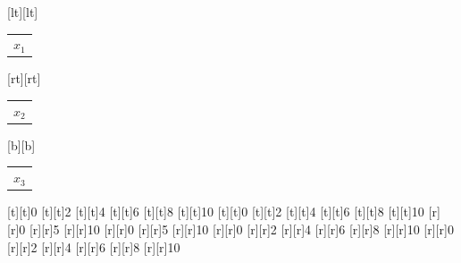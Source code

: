 %    
%
%
\begin{psfrags}%
\psfragscanon%
%
[lt][lt]{\color[rgb]{0,0,0}\setlength{\tabcolsep}{0pt}\begin{tabular}{l}$x_1$\end{tabular}}%
[rt][rt]{\color[rgb]{0,0,0}\setlength{\tabcolsep}{0pt}\begin{tabular}{r}$x_2$\end{tabular}}%
[b][b]{\color[rgb]{0,0,0}\setlength{\tabcolsep}{0pt}\begin{tabular}{c}$x_3$\end{tabular}}%
%
[t][t]{0}%
[t][t]{2}%
[t][t]{4}%
[t][t]{6}%
[t][t]{8}%
[t][t]{10}%
[t][t]{0}%
[t][t]{2}%
[t][t]{4}%
[t][t]{6}%
[t][t]{8}%
[t][t]{10}%
%
[r][r]{0}%
[r][r]{5}%
[r][r]{10}%
[r][r]{0}%
[r][r]{5}%
[r][r]{10}%
%
[r][r]{0}%
[r][r]{2}%
[r][r]{4}%
[r][r]{6}%
[r][r]{8}%
[r][r]{10}%
[r][r]{0}%
[r][r]{2}%
[r][r]{4}%
[r][r]{6}%
[r][r]{8}%
[r][r]{10}%
%
%
\end{psfrags}%
%
